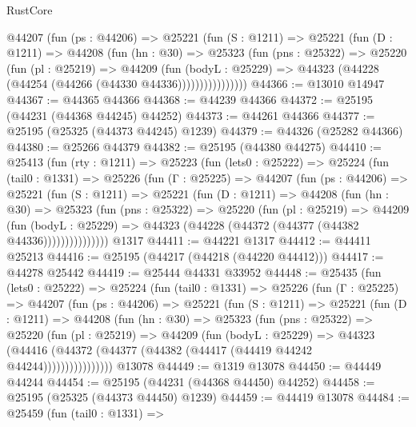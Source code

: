 \begin{lexlean}{RustCore}
\begin{coremodule}
            @44207
              (fun (ps : @44206) =>
              @25221
                (fun (S : @1211) =>
                @25221
                  (fun (D : @1211) =>
                  @44208
                    (fun (hn : @30) =>
                    @25323
                      (fun (pns : @25322) =>
                      @25220
                        (fun (pl : @25219) =>
                        @44209
                          (fun (bodyL : @25229) =>
                          @44323 (@44228 (@44254 (@44266 (@44330 @44336))))))))))))))))
@44366 := @13010 @14947
@44367 := @44365 @44366
@44368 := @44239 @44366
@44372 := @25195 (@44231 (@44368 @44245) @44252)
@44373 := @44261 @44366
@44377 := @25195 (@25325 (@44373 @44245) @1239)
@44379 := @44326 (@25282 @44366)
@44380 := @25266 @44379
@44382 := @25195 (@44380 @44275)
@44410 := @25413
    (fun (rty : @1211) =>
    @25223
      (fun (lets0 : @25222) =>
      @25224
        (fun (tail0 : @1331) =>
        @25226
          (fun (Γ : @25225) =>
          @44207
            (fun (ps : @44206) =>
            @25221
              (fun (S : @1211) =>
              @25221
                (fun (D : @1211) =>
                @44208
                  (fun (hn : @30) =>
                  @25323
                    (fun (pns : @25322) =>
                    @25220
                      (fun (pl : @25219) =>
                      @44209
                        (fun (bodyL : @25229) =>
                        @44323 (@44228 (@44372 (@44377 (@44382 @44336)))))))))))))))
    @1317
@44411 := @44221 @1317
@44412 := @44411 @25213
@44416 := @25195 (@44217 (@44218 (@44220 @44412)))
@44417 := @44278 @25442
@44419 := @25444 @44331 @33952
@44448 := @25435
    (fun (lets0 : @25222) =>
    @25224
      (fun (tail0 : @1331) =>
      @25226
        (fun (Γ : @25225) =>
        @44207
          (fun (ps : @44206) =>
          @25221
            (fun (S : @1211) =>
            @25221
              (fun (D : @1211) =>
              @44208
                (fun (hn : @30) =>
                @25323
                  (fun (pns : @25322) =>
                  @25220
                    (fun (pl : @25219) =>
                    @44209
                      (fun (bodyL : @25229) =>
                      @44323
                        (@44416
                          (@44372 (@44377 (@44382 (@44417 (@44419 @44242 @44244))))))))))))))))
    @13078
@44449 := @1319 @13078
@44450 := @44449 @44244
@44454 := @25195 (@44231 (@44368 @44450) @44252)
@44458 := @25195 (@25325 (@44373 @44450) @1239)
@44459 := @44419 @13078
@44484 := @25459
    (fun (tail0 : @1331) =>

\end{coremodule}
\end{lexlean}
